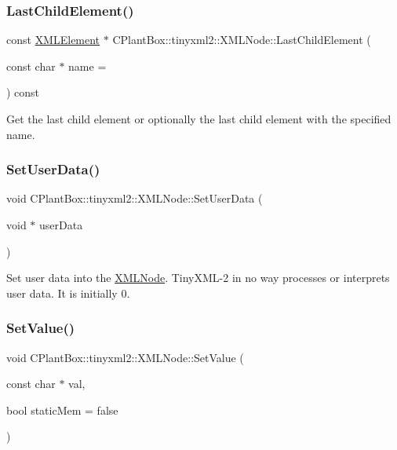 \subsubsection{\texorpdfstring{Last\+Child\+Element()}{LastChildElement()}}
{\footnotesize\ttfamily const \hyperlink{classCPlantBox_1_1tinyxml2_1_1XMLElement}{X\+M\+L\+Element} $\ast$ C\+Plant\+Box\+::tinyxml2\+::\+X\+M\+L\+Node\+::\+Last\+Child\+Element (\begin{DoxyParamCaption}\item[{const char $\ast$}]{name = {} }\end{DoxyParamCaption}) const}

Get the last child element or optionally the last child element with the specified name. \mbox{\label{classCPlantBox_1_1tinyxml2_1_1XMLNode_a67f5ec20f5bf0623b39b5f8489f90590}} 
\subsubsection{\texorpdfstring{Set\+User\+Data()}{SetUserData()}}
{\footnotesize\ttfamily void C\+Plant\+Box\+::tinyxml2\+::\+X\+M\+L\+Node\+::\+Set\+User\+Data (\begin{DoxyParamCaption}\item[{void $\ast$}]{user\+Data }\end{DoxyParamCaption})\hspace{0.3cm}{\ttfamily [inline]}}

Set user data into the \hyperlink{classCPlantBox_1_1tinyxml2_1_1XMLNode}{X\+M\+L\+Node}. Tiny\+X\+M\+L-\/2 in no way processes or interprets user data. It is initially 0. \mbox{\label{classCPlantBox_1_1tinyxml2_1_1XMLNode_ae251b8df5dfb3dc434576456ee0e6805}} 
\subsubsection{\texorpdfstring{Set\+Value()}{SetValue()}}
{\footnotesize\ttfamily void C\+Plant\+Box\+::tinyxml2\+::\+X\+M\+L\+Node\+::\+Set\+Value (\begin{DoxyParamCaption}\item[{const char $\ast$}]{val,  }\item[{bool}]{static\+Mem = {\ttfamily false} }\end{DoxyParamCaption})}

